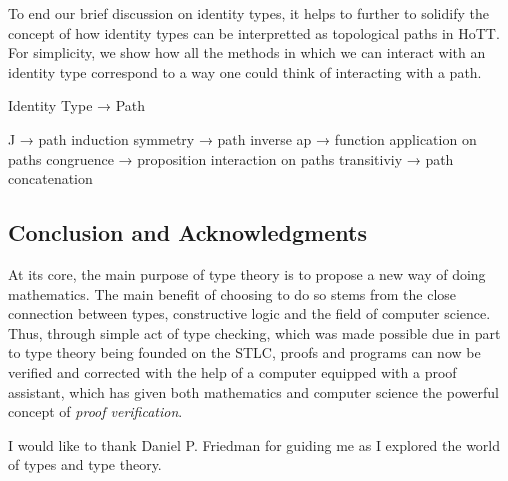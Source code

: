 \documentclass[12pt]{article}
\begin{document}
To end our brief discussion on identity types, it helps to further to solidify
the concept of how identity types can be interpretted as topological paths in
HoTT. For simplicity, we show how all the methods in which we can interact with
an identity type correspond to a way one could think of interacting with a path.
\begin{center}
\begin{minipage}{0.9\textwidth}
\begin{code}
Identity Type → Path

J → path induction
symmetry → path inverse
ap → function application on paths
congruence → proposition interaction on paths
transitiviy → path concatenation
\end{code}
\end{minipage}
\end{center}

\subsection*{Conclusion and Acknowledgments}
At its core, the main purpose of type theory is to propose a new way of doing
mathematics. The main benefit of choosing to do so stems from the close
connection between types, constructive logic and the field of computer science.
Thus, through simple act of type checking, which was made possible due in part
to type theory being founded on the STLC, proofs and programs can now be
verified and corrected with the help of a computer equipped with a proof
assistant, which has given both mathematics and computer science the powerful
concept of {\em proof verification}.

I would like to thank Daniel P. Friedman for guiding me as I explored the world
of types and type theory. 
\end{document}
